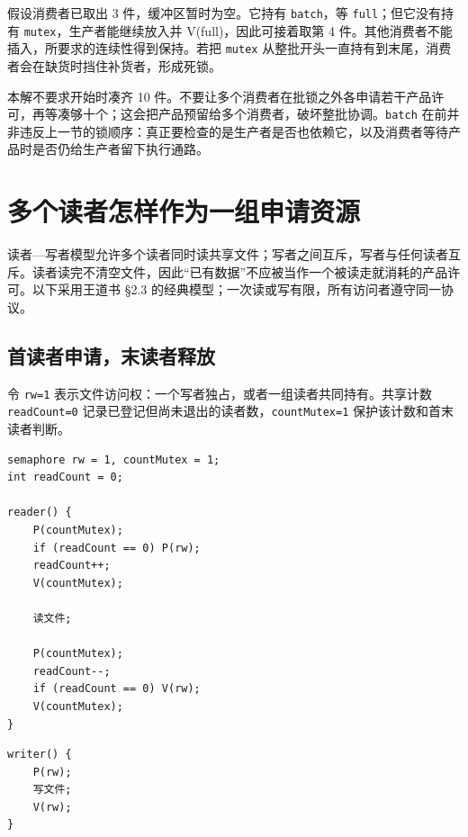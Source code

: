 假设消费者已取出 3 件，缓冲区暂时为空。它持有 \texttt{batch}，等 \texttt{full}；但它没有持有 \texttt{mutex}，生产者能继续放入并 V(full)，因此可接着取第 4 件。其他消费者不能插入，所要求的连续性得到保持。若把 \texttt{mutex} 从整批开头一直持有到末尾，消费者会在缺货时挡住补货者，形成死锁。

本解不要求开始时凑齐 10 件。不要让多个消费者在批锁之外各申请若干产品许可，再等凑够十个；这会把产品预留给多个消费者，破坏整批协调。\texttt{batch} 在前并非违反上一节的锁顺序：真正要检查的是生产者是否也依赖它，以及消费者等待产品时是否仍给生产者留下执行通路。

\section{多个读者怎样作为一组申请资源}\label{sec-readers}

读者---写者模型允许多个读者同时读共享文件；写者之间互斥，写者与任何读者互斥。读者读完不清空文件，因此``已有数据''不应被当作一个被读走就消耗的产品许可。以下采用王道书 §2.3 的经典模型；一次读或写有限，所有访问者遵守同一协议。

\subsection{首读者申请，末读者释放}\label{os-c03-h375}

令 \texttt{rw=1} 表示文件访问权：一个写者独占，或者一组读者共同持有。共享计数 \texttt{readCount=0} 记录已登记但尚未退出的读者数，\texttt{countMutex=1} 保护该计数和首末读者判断。

\par\medskip\noindent
\begin{minipage}{\linewidth}
\begin{verbatim}
semaphore rw = 1, countMutex = 1;
int readCount = 0;

reader() {
    P(countMutex);
    if (readCount == 0) P(rw);
    readCount++;
    V(countMutex);

    读文件;

    P(countMutex);
    readCount--;
    if (readCount == 0) V(rw);
    V(countMutex);
}
\end{verbatim}
\end{minipage}\par\medskip

\par\medskip\noindent
\begin{minipage}{\linewidth}
\begin{verbatim}
writer() {
    P(rw);
    写文件;
    V(rw);
}
\end{verbatim}
\end{minipage}\par\medskip

